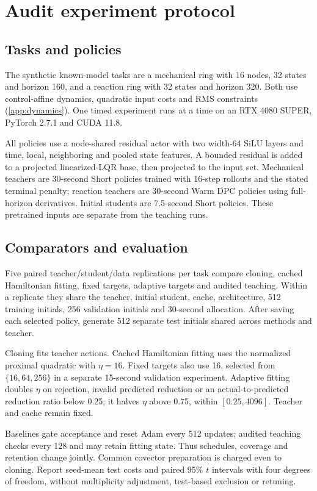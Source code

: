 \section{Audit experiment protocol}\label{app:audit-protocol}
\subsection{Tasks and policies}
The synthetic known-model tasks are a mechanical ring with 16 nodes,
32 states and horizon 160, and a reaction ring with 32 states and
horizon 320. Both use control-affine dynamics, quadratic input costs
and RMS constraints (\ref{app:dynamics}). One timed experiment runs
at a time on an RTX 4080 SUPER, PyTorch 2.7.1 and CUDA 11.8.

All policies use a node-shared residual actor with two width-64 SiLU
layers and time, local, neighboring and pooled state features. A bounded
residual is added to a projected linearized-LQR base, then projected
to the input set. Mechanical teachers are 30-second Short policies
trained with 16-step rollouts and the stated terminal penalty; reaction
teachers are 30-second Warm DPC policies using full-horizon derivatives.
Initial students are 7.5-second Short policies. These pretrained inputs
are separate from the teaching runs.

\subsection{Comparators and evaluation}
Five paired teacher/student/data replications per task compare cloning,
cached Hamiltonian fitting, fixed targets, adaptive targets and audited
teaching. Within a replicate they share the teacher, initial student,
cache, architecture, 512 training initials, 256 validation initials and
30-second allocation. After saving each selected policy, generate 512
separate test initials shared across methods and teacher.

Cloning fits teacher actions. Cached Hamiltonian fitting uses the
normalized proximal quadratic with $\eta=16$. Fixed targets also use
16, selected from $\{16,64,256\}$ in a separate 15-second validation
experiment. Adaptive fitting doubles $\eta$ on rejection, invalid
predicted reduction or an actual-to-predicted reduction ratio below
0.25; it halves $\eta$ above 0.75, within $[0.25,4096]$. Teacher and
cache remain fixed.

Baselines gate acceptance and reset Adam every 512 updates; audited
teaching checks every 128 and may retain fitting state. Thus schedules,
coverage and retention change jointly. Common covector preparation is
charged even to cloning. Report seed-mean test costs and paired 95\%
$t$ intervals with four degrees of freedom, without multiplicity
adjustment, test-based exclusion or retuning.

